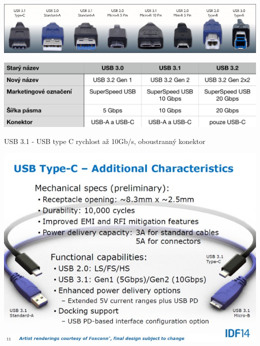 \documentclass[aspectratio=43]{beamer}
\begin{document}
\begin{frame}{}
	 
	\begin{center}
		\includegraphics[width=1\linewidth]{extrahovane_obrazky/img_3_page20_0.jpeg}
	\end{center}
	\begin{center}
		\includegraphics[width=1\linewidth]{extrahovane_obrazky/img_3_page20_1.png}
	\end{center}
	
\end{frame}


\begin{frame}{USB 3.1   - USB type  C}
	rychlost až 10Gb/s, oboustranný konektor
	\begin{center}
		\includegraphics[width=0.8\linewidth]{extrahovane_obrazky/img_3_page21_0.jpeg}
	\end{center}
	
\end{frame}
\end{document}
